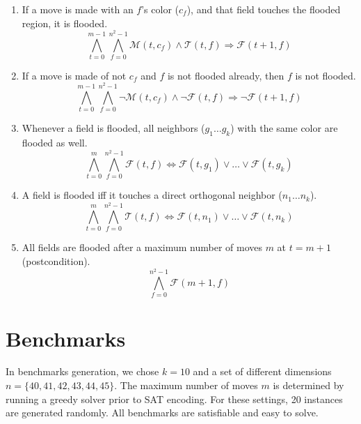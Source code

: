 \documentclass[conference]{IEEEtran}
\newcommand{\nMoves}{\ensuremath{m}\xspace}
\newcommand{\bSize}{\ensuremath{n}\xspace}
\newcommand{\clr}{\ensuremath{c}\xspace}
\newcommand{\nColors}{\ensuremath{k}\xspace}
\newcommand{\flood}[2]{\ensuremath{\mathcal{F}(#1,#2)}\xspace}
\newcommand{\move}[2]{\ensuremath{\mathcal{M}(#1,#2)}\xspace}
\newcommand{\touch}[2]{\ensuremath{\mathcal{T}(#1,#2)}\xspace}
\newcommand{\turn}{\ensuremath{t}\xspace}
\newcommand{\field}{\ensuremath{f}\xspace}
\begin{document}
\begin{enumerate}
	\item If a move is made with an \field's color ($\clr_\field$), and that field touches the flooded region, it is flooded.
	\begin{equation}
	\bigwedge_{\turn=0}^{\nMoves-1}
	\bigwedge_{\field=0}^{{\bSize^2}-1}
	\move{\turn}{\clr_\field}\wedge\touch{\turn}{\field}\Rightarrow\flood{\turn+1}{\field}
	\end{equation}
	\item If a move is made of not  $\clr_\field$ and \field is not flooded already, then \field is not flooded.
	\begin{equation}
	\bigwedge_{\turn=0}^{\nMoves-1}
	\bigwedge_{\field=0}^{{\bSize^2}-1}
	\neg\move{\turn}{\clr_\field}\wedge\neg\flood{\turn}{\field}\Rightarrow\neg\flood{\turn+1}{\field}
	\end{equation}
	\item Whenever a field is flooded, all neighbors ($g_1\dots g_k$) with the same color are flooded as well.
	\begin{equation}
	\bigwedge_{\turn=0}^{\nMoves}
	\bigwedge_{\field=0}^{{\bSize^2}-1}
	\flood{\turn}{\field}\Leftrightarrow\flood{\turn}{g_1}\vee\dots\vee\flood{\turn}{g_k}
	\end{equation} 
	\item A field is flooded iff it touches a direct orthogonal neighbor ($\bSize_1\dots \bSize_k$).
	\begin{equation}
	\bigwedge_{\turn=0}^{\nMoves}
	\bigwedge_{\field=0}^{{\bSize^2}-1}
	\touch{\turn}{\field}\Leftrightarrow\flood{\turn}{n_1}\vee\dots\vee\flood{\turn}{n_k}
	\end{equation} 
	\item All fields are flooded after a maximum number of moves \nMoves at $\turn=\nMoves+1$ (postcondition).
	\begin{equation}
	\bigwedge_{\field=0}^{{\bSize^2}-1}
	\flood{\nMoves+1}{\field}
	\end{equation} 
\end{enumerate}
\section{Benchmarks}
In benchmarks generation, we chose $\nColors=10$ and a set of different dimensions $n=\{40,41,42,43,44,45\}$. The maximum number of moves \nMoves is determined by running a greedy solver prior to SAT encoding. For these settings, 20 instances are generated randomly. All benchmarks are satisfiable and easy to solve.


\end{document}

